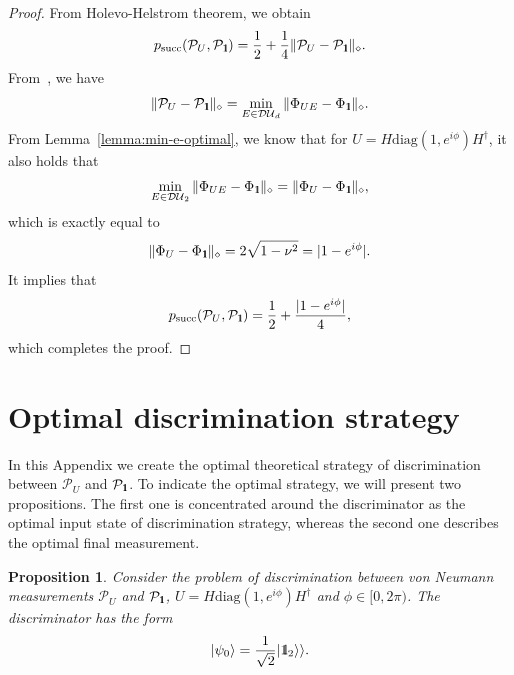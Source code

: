 \documentclass[preprint,12pt, a4paper, dvipsnames]{elsarticle}
\newcommand{\ket}[1]{\ensuremath{|#1\rangle}}
\newcommand{\1}{{\rm 1\hspace{-0.9mm}l}}
\newcommand{\Id}{{\rm 1\hspace{-0.9mm}l}}
\newcommand{\PP}{\mathcal{P}}
\newcommand{\diaguni}{\ensuremath{\mathcal{DU}}}
\newcommand{\diag}{\mathrm{diag}}
\newtheorem{proposition}{Proposition}
\begin{document}
\begin{proof}
	From Holevo-Helstrom theorem, we obtain
	\begin{equation}
	p_{\text{succ}}(\PP_{U}, \PP_{\Id}) = \frac{1}{2} + \frac{1}{4} \| \PP_{U} - \PP_{\Id} \|_\diamond.
	\end{equation}
	From~\cite[Theorem 1]{puchala2018strategies}, we have
	\begin{equation}
	\|\PP_U - \PP_\Id\|_\diamond = \min_{E \in \diaguni_d} \|\Phi_{UE} -
	\Phi_\Id\|_\diamond.
	\end{equation}
	From Lemma~\ref{lemma:min-e-optimal},  we know that for
	$U =  H \diag(1, e^{i \phi}) H^\dagger$,  it also holds that
	\begin{equation}
	\min_{E \in \diaguni_2} \|\Phi_{UE} -
	\Phi_\Id\|_\diamond = \|\Phi_{U} -
	\Phi_\Id\|_\diamond,
	\end{equation} which is exactly equal to
	\begin{equation}
	\|\Phi_{U} -
	\Phi_\Id\|_\diamond = 2\sqrt{1 - \nu^2} = |1-e^{i   \phi }|.
	\end{equation}
	It implies that
	\begin{equation}
	p_{\text{succ}}(\PP_{U}, \PP_{\Id}) = \frac{1}{2} + \frac{|1-e^{i \phi}|}{4},
	\end{equation} which completes the proof.
\end{proof}

\section{Optimal discrimination strategy} \label{app:optimal-strategy}


In this Appendix we create the optimal
theoretical strategy of  discrimination between $\PP_{U}$ and $\PP_{\Id}$.
To indicate the optimal strategy, we will present two propositions. The first one is concentrated around the discriminator as the optimal input state of discrimination strategy, whereas the second one describes the optimal final measurement.


\begin{proposition}\label{prop-discrim}
	Consider the problem of discrimination between von Neumann measurements $\PP_U$
	and $\PP_\1$, $U = H\diag(1, e^{i \phi}) H^\dagger $ and $\phi \in [0,
	2\pi)$.  The  discriminator has the form
	\begin{equation}
	\ket{\psi_{0}} = \frac{1}{\sqrt{2}} |\Id_2 \rangle \rangle.
	\end{equation}
\end{proposition}
\end{document}
